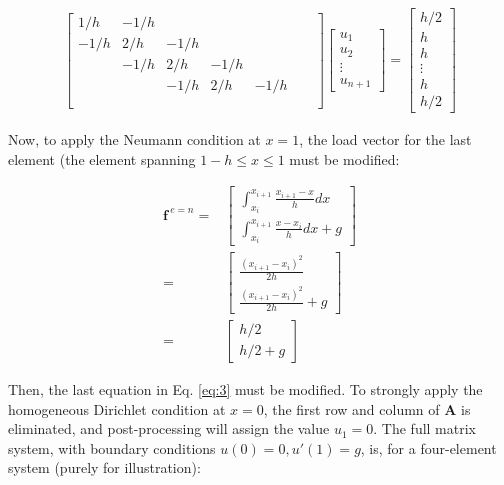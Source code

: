 \documentclass[10pt]{article}
\newcommand{\beqa}{\begin{equation}\begin{aligned}}
\newcommand{\eeqa}{\end{aligned}\end{equation}}
\begin{document}
\beqa
\label{eq:3}
\begin{bmatrix}
1/h & -1/h & & & & &\\
-1/h & 2/h & -1/h & & & & \\
 & -1/h & 2/h & -1/h & & & \\
 & & -1/h & 2/h & -1/h & & \\
 & & & & & &\\
\end{bmatrix}
\begin{bmatrix}u_1\\u_2\\\vdots\\u_{n+1}\end{bmatrix} = 
\begin{bmatrix}
h/2\\ h\\h\\\vdots\\h\\h/2
\end{bmatrix}
\eeqa

Now, to apply the Neumann condition at \(x=1\), the load vector for the last element (the element spanning \(1-h\leq x\leq1\) must be modified:

\beqa
\textbf{f}^{\ e=n}=& \begin{bmatrix}	\int_{x_i}^{x_{i+1}}\frac{x_{i+1}-x}{h}dx \\
										\int_{x_i}^{x_{i+1}}\frac{x-x_i}{h}dx+g
					\end{bmatrix}\\
			   =& \begin{bmatrix}	\frac{(x_{i+1}-x_i)^2}{2h}\\
										\frac{(x_{i+1}-x_i)^2}{2h}+g
					\end{bmatrix}\\
				=& \begin{bmatrix}	h/2\\ 
										h/2+g
					\end{bmatrix}
\eeqa

Then, the last equation in Eq. \eqref{eq:3} must be modified. To strongly apply the homogeneous Dirichlet condition at \(x=0\), the first row and column of \textbf{A} is eliminated, and post-processing will assign the value \(u_1=0\). The full matrix system, with boundary conditions \(u(0)=0, u'(1)=g\), is, for a four-element system (purely for illustration):
\end{document}
